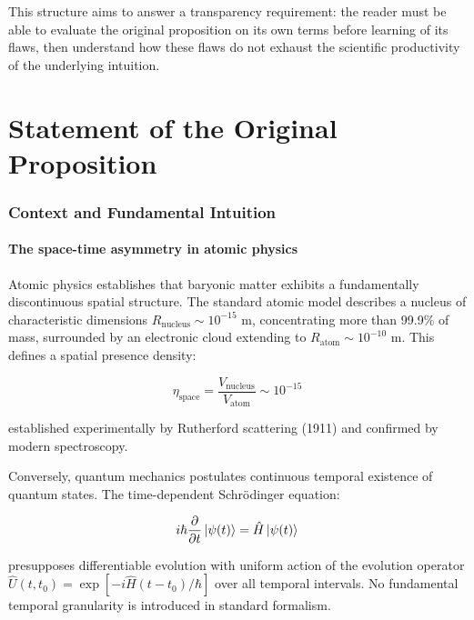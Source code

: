 \documentclass[11pt,a4paper]{article}
\begin{document}
This structure aims to answer a transparency requirement: the reader must be able to evaluate the original proposition on its own terms before learning of its flaws, then understand how these flaws do not exhaust the scientific productivity of the underlying intuition.

\part{Statement of the Original Proposition}

\section{Context and Fundamental Intuition}

\subsection{The space-time asymmetry in atomic physics}

Atomic physics establishes that baryonic matter exhibits a fundamentally discontinuous spatial structure. The standard atomic model describes a nucleus of characteristic dimensions $R_{\text{nucleus}} \sim 10^{-15}$ m, concentrating more than 99.9\% of mass, surrounded by an electronic cloud extending to $R_{\text{atom}} \sim 10^{-10}$ m. This defines a spatial presence density:

\begin{equation}\label{eq:eta_space}
\eta_{\text{space}} = \frac{V_{\text{nucleus}}}{V_{\text{atom}}} \sim 10^{-15}
\end{equation}

established experimentally by Rutherford scattering (1911) and confirmed by modern spectroscopy.

Conversely, quantum mechanics postulates continuous temporal existence of quantum states. The time-dependent Schrödinger equation:

\begin{equation}\label{eq:schrodinger}
i\hbar \frac{\partial}{\partial t}\ket{\psi(t)} = \hat{H}\ket{\psi(t)}
\end{equation}

presupposes differentiable evolution with uniform action of the evolution operator $\hat{U}(t,t_0) = \exp[-i\hat{H}(t-t_0)/\hbar]$ over all temporal intervals. No fundamental temporal granularity is introduced in standard formalism.
\end{document}
